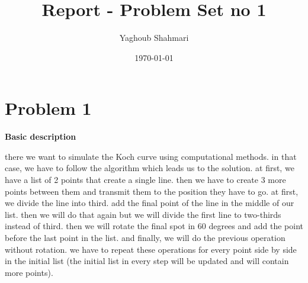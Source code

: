 \documentclass{article}
\author{Yaghoub Shahmari}
\title{Report - Problem Set no 1}
\date{\today}
\begin{document}
\maketitle
\section*{Problem 1}
    \textbf{Basic description}
    
    there we want to simulate the Koch curve using computational methods.
    in that case, we have to follow the algorithm which leads us to the solution.
    at first, we have a list of 2 points that create a single line.
    then we have to create 3 more points between them and transmit them to the position they have to go.
    at first, we divide the line into third.
    add the final point of the line in the middle of our list.
    then we will do that again but we will divide the first line to two-thirds instead of third.
    then we will rotate the final spot in 60 degrees and add the point before the last point in the list.
    and finally, we will do the previous operation without rotation.
    we have to repeat these operations for every point side by side in the initial list
    (the initial list in every step will be updated and will contain more points).
\end{document}
